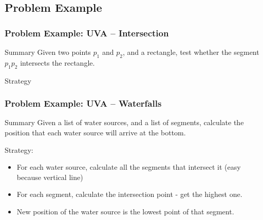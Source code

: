 \documentclass{beamer}
\begin{document}
\subsection{Problem Example}
\begin{frame}
  \frametitle{Problem Example: UVA -- Intersection}
  {\small
    \begin{block}{Summary}
    Given two points $p_1$ and $p_2$, and a rectangle, test whether
    the segment $p_1p_2$ intersects the rectangle.
    \end{block}

    Strategy

  }
\end{frame}

\begin{frame}
  \frametitle{Problem Example: UVA -- Waterfalls}
  {\small
    \begin{block}{Summary}
      Given a list of water sources, and a list of segments, calculate the position that 
      each water source will arrive at the bottom.
    \end{block}

    Strategy:
    \begin{itemize}
    \item For each water source, calculate all the segments that intersect it (easy because vertical line)
    \item For each segment, calculate the intersection point - get the highest one.
    \item New position of the water source is the lowest point of that segment.
      
      \bigskip

    \end{itemize}
  }
\end{frame}
\end{document}
